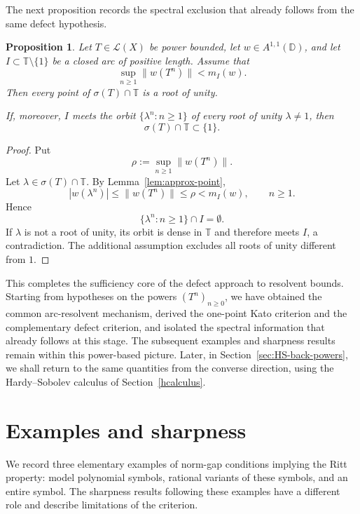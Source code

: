 \documentclass[11pt]{amsart}
\numberwithin{equation}{section}
\newtheorem{proposition}[theorem]{Proposition}
\theoremstyle{definition}
\theoremstyle{plain}
\def\T{\mathbb{T}}
\begin{document}
The next proposition records the spectral exclusion that already follows from the same defect hypothesis.
\begin{proposition}\label{prop:power-KB-spectrum-exclusion}
Let \(T\in\mathcal L(X)\) be power bounded, let
\(w\in A^{1,1}(\mathbb D)\), and let
\(I\subset\mathbb T\setminus\{1\}\) be a closed arc of positive length.
Assume that
\[
        \sup_{n\ge1}\|w(T^n)\|<m_I(w).
\]
Then every point of \(\sigma(T)\cap\T\) is a root of unity.

If, moreover, \(I\) meets the orbit
\(\{\lambda^n:n\ge1\}\) of every root of unity
\(\lambda\neq1\), then
\[
        \sigma(T)\cap\T\subset\{1\}.
\]
\end{proposition}

\begin{proof}
Put
\[
        \rho:=\sup_{n\ge1}\|w(T^n)\|.
\]
Let \(\lambda\in\sigma(T)\cap\T\). By
Lemma~\ref{lem:approx-point},
\[
        |w(\lambda^n)|
        \le
        \|w(T^n)\|
        \le\rho
        <
        m_I(w),
        \qquad n\ge1.
\]
Hence
\[
        \{\lambda^n:n\ge1\}\cap I=\emptyset.
\]
If \(\lambda\) is not a root of unity, its orbit is dense in \(\T\)
and therefore meets 
 \(I\), a
contradiction. The additional assumption excludes all roots of unity
different from \(1\).
\end{proof}




This completes the sufficiency core of the defect approach to resolvent bounds. Starting from hypotheses on the
powers $(T^n)_{n \ge 0}$, we have obtained the common arc-resolvent mechanism, derived
the one-point Kato criterion and the complementary defect criterion, and isolated
the spectral information that already follows at this stage. 
The subsequent examples and sharpness results remain within this power-based picture.
Later, in Section~\ref{sec:HS-back-powers}, we shall return to the same
quantities from the converse direction, using the Hardy--Sobolev calculus
of Section~\ref{hcalculus}.




\section{Examples and sharpness}\label{examples-sec}


We record three elementary examples of norm-gap conditions implying
the Ritt property: model polynomial symbols, rational variants of these
symbols, and an entire symbol.
 The sharpness results following these
examples have a different role and describe limitations of the criterion.
\end{document}

